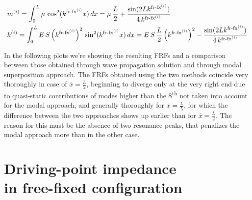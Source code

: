 \documentclass[a4paper,12pt,oneside]{article}
\begin{document}
\[ \begin{split}
	& m^{(i)} = \int_0^L \mu \, \cos^2(k^{\textup{fr-fx}^{(i)}} x) \, dx =
		\mu \, \frac{L}{2} + \frac{\sin(2 L k^{\textup{fr-fx}^{(i)}})}
		{4 \, k^{\textup{fr-fx}^{(i)}}} \\
	& k^{(i)} = \int_0^L E \, S \, \Bigl(k^{\textup{fr-fx}^{(i)}}\Bigr)^2 \,
		\sin^2(k^{\textup{fr-fx}^{(i)}} x) \, dx =
		E \, S \, \frac{L}{2} \, \Bigl(k^{\textup{fr-fx}^{(i)}}\Bigr)^2 -
		\frac{\sin(2 L k^{\textup{fr-fx}^{(i)}})}{4 \, k^{\textup{fr-fx}^{(i)}}}
\end{split} \]

\vspace{20pt}

In the following plots we're showing the resulting FRFs and a comparison between those obtained through wave propagation solution and through modal superposition approach. The FRFs obtained using the two methods coincide very thoroughly in case of $ \bar{x} = \frac{L}{2} $, beginning to diverge only at the very right end due to quasi-static contributions of modes higher than the 8\textsuperscript{th} not taken into account for the modal approach, and generally thoroughly for $ \bar{x} = \frac{L}{5} $, for which the difference between the two approaches shows up earlier than for $ \bar{x} = \frac{L}{2} $. The reason for this must be the absence of two resonance peaks, that penalizes the modal approach more than in the other case. %

\vspace{150pt}

\begin{figure}[h]
	\centering
	\def\svgwidth{\columnwidth}
	
\end{figure}

\clearpage

\begin{figure}[h]
	\vspace{50pt}
	\centering
	\def\svgwidth{\columnwidth}
	
\end{figure}


\section{Driving-point impedance \\ in free-fixed configuration}
\end{document}
